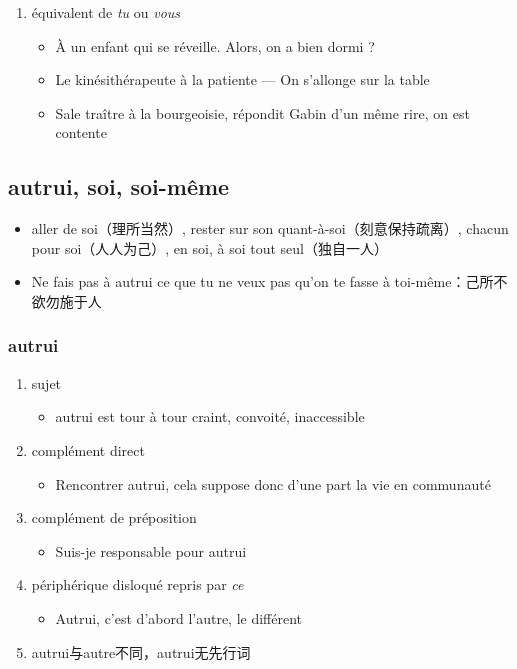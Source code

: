\documentclass[UTF8]{report}
\begin{document}
\begin{enumerate}
\begin{enumerate}
\begin{enumerate}
    \end{enumerate}
    \item équivalent de \textit{tu} ou \textit{vous}
    \begin{itemize}
        \item À un enfant qui se réveille. Alors, on a bien dormi ?
        \item Le kinésithérapeute à la patiente — On s’allonge sur la table
        \item Sale traître à la bourgeoisie, répondit Gabin d’un même rire, on est contente
    \end{itemize}
\end{enumerate}
\end{enumerate}

\subsection{autrui, soi, soi-même}
\begin{itemize}
    \item aller de soi（理所当然）, rester sur son quant-à-soi（刻意保持疏离）, chacun pour soi（人人为己）, en soi, à soi tout seul（独自一人）
    \item Ne fais pas à autrui ce que tu ne veux pas qu’on te fasse à toi-même：己所不欲勿施于人
\end{itemize}
\subsubsection{autrui}
\begin{enumerate}
    \item sujet
    \begin{itemize}
        \item autrui est tour à tour craint, convoité, inaccessible
    \end{itemize}
    \item complément direct
    \begin{itemize}
        \item Rencontrer autrui, cela suppose donc d’une part la vie en communauté
    \end{itemize}
    \item complément de préposition
    \begin{itemize}
        \item Suis-je responsable pour autrui
    \end{itemize}
    \item périphérique disloqué repris par \textit{ce}
    \begin{itemize}
        \item Autrui, c’est d’abord l’autre, le différent
    \end{itemize}
    \item autrui与autre不同，autrui无先行词
\end{enumerate}
\end{document}
